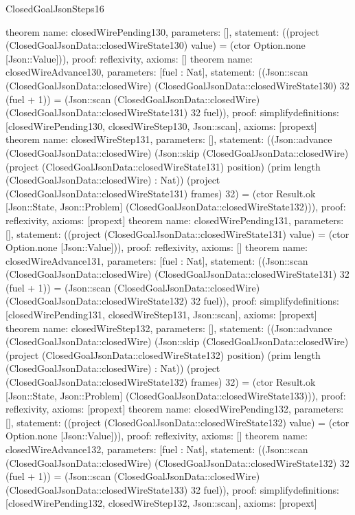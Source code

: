 \begin{lexlean}{ClosedGoalJsonSteps16}
\begin{semanticmodule}
{}
theorem{
 name: closedWirePending130, parameters: [],
 statement: ((project (ClosedGoalJsonData::closedWireState130) value) = (ctor Option.none [Json::Value])), proof: reflexivity{}, axioms: []
}
theorem{
 name: closedWireAdvance130, parameters: [fuel : Nat],
 statement: ((Json::scan (ClosedGoalJsonData::closedWire) (ClosedGoalJsonData::closedWireState130) 32 (fuel + 1)) = (Json::scan (ClosedGoalJsonData::closedWire) (ClosedGoalJsonData::closedWireState131) 32 fuel)), proof: simplify{definitions: [closedWirePending130, closedWireStep130, Json::scan]}, axioms: [propext]
}
theorem{
 name: closedWireStep131, parameters: [],
 statement: ((Json::advance (ClosedGoalJsonData::closedWire) (Json::skip (ClosedGoalJsonData::closedWire) (project (ClosedGoalJsonData::closedWireState131) position) (prim length (ClosedGoalJsonData::closedWire) : Nat)) (project (ClosedGoalJsonData::closedWireState131) frames) 32) = (ctor Result.ok [Json::State, Json::Problem] (ClosedGoalJsonData::closedWireState132))), proof: reflexivity{}, axioms: [propext]
}
theorem{
 name: closedWirePending131, parameters: [],
 statement: ((project (ClosedGoalJsonData::closedWireState131) value) = (ctor Option.none [Json::Value])), proof: reflexivity{}, axioms: []
}
theorem{
 name: closedWireAdvance131, parameters: [fuel : Nat],
 statement: ((Json::scan (ClosedGoalJsonData::closedWire) (ClosedGoalJsonData::closedWireState131) 32 (fuel + 1)) = (Json::scan (ClosedGoalJsonData::closedWire) (ClosedGoalJsonData::closedWireState132) 32 fuel)), proof: simplify{definitions: [closedWirePending131, closedWireStep131, Json::scan]}, axioms: [propext]
}
theorem{
 name: closedWireStep132, parameters: [],
 statement: ((Json::advance (ClosedGoalJsonData::closedWire) (Json::skip (ClosedGoalJsonData::closedWire) (project (ClosedGoalJsonData::closedWireState132) position) (prim length (ClosedGoalJsonData::closedWire) : Nat)) (project (ClosedGoalJsonData::closedWireState132) frames) 32) = (ctor Result.ok [Json::State, Json::Problem] (ClosedGoalJsonData::closedWireState133))), proof: reflexivity{}, axioms: [propext]
}
theorem{
 name: closedWirePending132, parameters: [],
 statement: ((project (ClosedGoalJsonData::closedWireState132) value) = (ctor Option.none [Json::Value])), proof: reflexivity{}, axioms: []
}
theorem{
 name: closedWireAdvance132, parameters: [fuel : Nat],
 statement: ((Json::scan (ClosedGoalJsonData::closedWire) (ClosedGoalJsonData::closedWireState132) 32 (fuel + 1)) = (Json::scan (ClosedGoalJsonData::closedWire) (ClosedGoalJsonData::closedWireState133) 32 fuel)), proof: simplify{definitions: [closedWirePending132, closedWireStep132, Json::scan]}, axioms: [propext]
}
\end{semanticmodule}
\end{lexlean}
